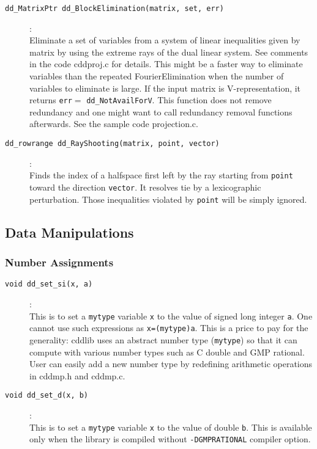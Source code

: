 \documentclass[11pt]{article}
\newcommand {\0} {{\bf 0}}
\begin{document}
\begin{description}
\item[{\tt dd\_MatrixPtr dd\_BlockElimination(matrix, set, err)}]:\\
Eliminate a set of variables from a system of linear inequalities
given by matrix by using the extreme rays of the dual linear system.
See comments in the code cddproj.c for details.  This might be
a faster way to eliminate variables than the repeated FourierElimination when
the number of variables to eliminate is large. 
If the input matrix is V-representation, it returns
{\tt  err}$=$ {\tt dd\_NotAvailForV}.
This function does not remove redundancy  and one might want to call
redundancy removal functions afterwards. See the sample code projection.c.


\item[{\tt dd\_rowrange dd\_RayShooting(matrix, point, vector)}]:\\
Finds the index of a halfspace first left by the ray starting from
{\tt point} toward the direction {\tt vector}.  It resolves
tie by a lexicographic perturbation.  Those inequalities violated
by {\tt point} will be simply ignored.

\end{description}


\subsection{Data Manipulations}  \label{DataLibrary}

\subsubsection{Number Assignments}
\begin{description}

\item[{\tt void dd\_set\_si(x, a)}]:\\
This is to set a {\tt mytype} variable {\tt x} to the
value of signed long integer {\tt a}.  One
 cannot use such expressions as {\tt x=(mytype)a}.
This is a price to pay for the generality:
cddlib uses an abstract number type ({\tt mytype}) 
so that it can compute with various 
number types such as C double and GMP rational.
User can easily add a new number type by redefining
arithmetic operations in cddmp.h and cddmp.c.

\item[{\tt void dd\_set\_d(x, b)}]:\\
This is to set a {\tt mytype} variable {\tt x} to the
value of double {\tt b}.  This is available only
when the library is compiled without {\tt -DGMPRATIONAL}
compiler option.

\end{description}
\end{document}

